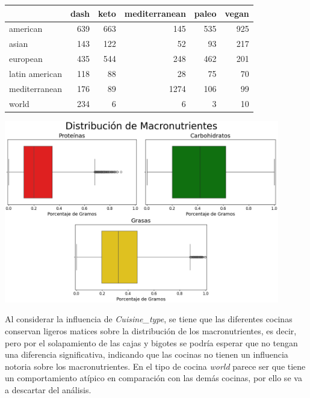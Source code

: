 \documentclass[12pt,a4paper]{article}
\begin{document}
{{            \begin{center}
                \begin{tabular}{l|rrrrr}
                \toprule
                    & dash & keto & mediterranean & paleo & vegan \\
                \midrule
                    american & 639 & 663 & 145 & 535 & 925 \\
                    asian & 143 & 122 & 52 & 93 & 217 \\
                    european & 435 & 544 & 248 & 462 & 201 \\
                    latin american & 118 & 88 & 28 & 75 & 70 \\
                    mediterranean & 176 & 89 & 1274 & 106 & 99 \\
                    world & 234 & 6 & 6 & 3 & 10 \\
                \bottomrule
                \end{tabular}

                \includegraphics[width=0.9\textwidth]{Resources/EDA/VisionGeneral_1.png}
            \end{center}

            Al considerar la influencia de \emph{Cuisine\_type}, se tiene que las diferentes 
            cocinas conservan ligeros matices sobre la distribución de los macronutrientes, es 
            decir, pero por el solapamiento de las cajas y bigotes se podría esperar que no tengan 
            una diferencia significativa, indicando que las cocinas no tienen un influencia notoria 
            sobre los macronutrientes. En el tipo de cocina \emph{world} parece ser que tiene 
            un comportamiento atípico en comparación con las demás cocinas, por ello se va a 
            descartar del análisis.

}}
\end{document}
